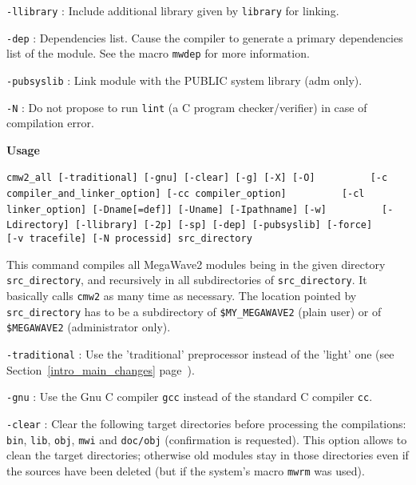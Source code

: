 \verb+-llibrary+ : Include additional library given by \verb+library+ for linking.

\verb+-dep+ : Dependencies list. Cause the compiler to generate a primary dependencies list of the module. See the macro \verb+mwdep+ for more information.

\verb+-pubsyslib+ : Link module with the PUBLIC system library (adm only).

\verb+-N+ : Do not propose to run \verb+lint+ (a C program checker/verifier) in case of compilation error.

\newpage

{\Large\bf Usage} \bigskip

\verb+cmw2_all [-traditional] [-gnu] [-clear] [-g] [-X] [-O]+
\newline
\verb+         [-c compiler_and_linker_option] [-cc compiler_option]+
\newline
\verb+         [-cl linker_option] [-Dname[=def]] [-Uname] [-Ipathname] [-w]+
\newline
\verb+         [-Ldirectory] [-llibrary] [-2p] [-sp] [-dep] [-pubsyslib] [-force]+
\newline
\verb+         [-v tracefile] [-N processid] src_directory+

\Next

\Description
This command compiles all MegaWave2 modules being in the given directory \verb+src_directory+, and recursively in all subdirectories of \verb+src_directory+.
It basically calls \verb+cmw2+ as many time as necessary. 
The location pointed by  \verb+src_directory+ has to be a subdirectory of \verb+$MY_MEGAWAVE2+ 
(plain user) or of \verb+$MEGAWAVE2+ (administrator only).
\Next

\Options

\verb+-traditional+ : Use the 'traditional' preprocessor instead of the 'light' one
(see Section~\ref{intro_main_changes} page~\pageref{intro_main_changes}).

\verb+-gnu+ : Use the Gnu C compiler \verb+gcc+ instead of the standard C compiler \verb+cc+.

\verb+-clear+ : Clear the following target directories before processing the
compilations: \verb+bin+, \verb+lib+, \verb+obj+, \verb+mwi+ and \verb+doc/obj+ 
(confirmation is requested).
This option allows to clean the target directories; otherwise old modules stay
in those directories even if the sources have been deleted (but if the system's macro
\verb+mwrm+ was used).

